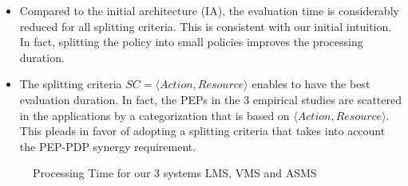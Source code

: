 \begin{itemize} 
\item Compared to the initial architecture (IA), the evaluation time is considerably reduced for all splitting criteria. This is consistent with our 
initial intuition. In fact, splitting the policy into small policies improves the processing duration.
\item The splitting criteria \normalsize $SC=\langle Action, Resource\rangle$ enables to have the best evaluation duration. 
In fact, the PEPs in the 3 empirical studies are scattered in the applications by a categorization
 that is based on $\langle Action, Resource\rangle$. This pleads in favor of adopting a
 splitting criteria that takes into account the PEP-PDP synergy requirement.
\end{itemize} 
\begin{figure}
  \centering
  \caption{Processing Time for our 3 systems LMS, VMS and ASMS}
  \label{fig:processing time}
\end{figure}
